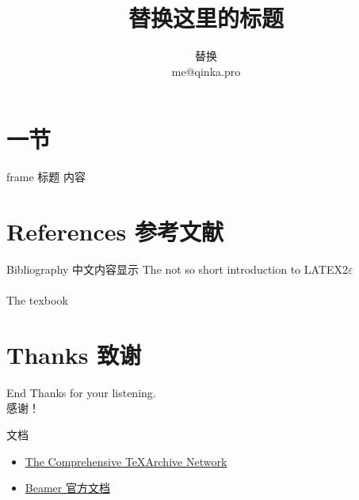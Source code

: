 \documentclass[10pt, mathserif]{beamer}
\begin{document}
    \title[abbreviation]{替换这里的标题}
    \author{ 替换 \\ me@qinka.pro}


    \begin{frame}
        \titlepage
    \end{frame}

    \section{一节}
    \begin{frame}{frame 标题}
        内容
    \end{frame}

    \section{References 参考文献}
    \begin{frame}[allowframebreaks]{Bibliography}
        中文内容显示
        The not so short introduction to LATEX2$\varepsilon$ \cite{Oetiker2015Latex} \\
        ~\\
        The texbook \cite{knuth1984texbook}
        \label{Reference}
    \end{frame}

    \section{Thanks 致谢}
    \begin{frame}{End}
        Thanks for your listening. \\
        感谢！
    \end{frame}

    \begin{frame}{文档}
        \begin{itemize}
            \item \href{https://www.ctan.org}{The Comprehensive \TeX Archive Network}
            \item \href{http://mirrors.ctan.org/macros/latex/contrib/beamer/doc/beameruserguide.pdf}%
                {Beamer 官方文档}
        \end{itemize}
    \end{frame}
\end{document}
